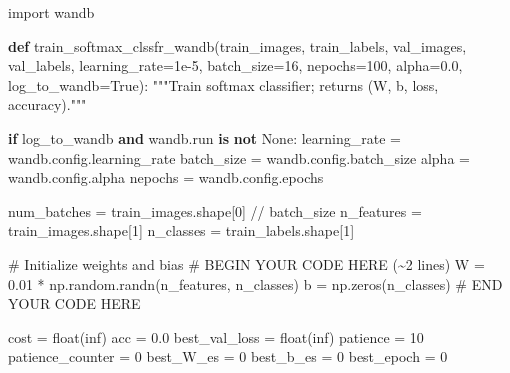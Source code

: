 \documentclass[
  letterpaper,
  DIV=11,
  numbers=noendperiod]{scrartcl}
\newenvironment{Shaded}{\begin{snugshade}}{\end{snugshade}}
\newcommand{\BuiltInTok}[1]{\textcolor[rgb]{0.00,0.23,0.31}{#1}}
\newcommand{\CommentTok}[1]{\textcolor[rgb]{0.37,0.37,0.37}{#1}}
\newcommand{\ControlFlowTok}[1]{\textcolor[rgb]{0.00,0.23,0.31}{\textbf{#1}}}
\newcommand{\DecValTok}[1]{\textcolor[rgb]{0.68,0.00,0.00}{#1}}
\newcommand{\FloatTok}[1]{\textcolor[rgb]{0.68,0.00,0.00}{#1}}
\newcommand{\ImportTok}[1]{\textcolor[rgb]{0.00,0.46,0.62}{#1}}
\newcommand{\KeywordTok}[1]{\textcolor[rgb]{0.00,0.23,0.31}{\textbf{#1}}}
\newcommand{\NormalTok}[1]{\textcolor[rgb]{0.00,0.23,0.31}{#1}}
\newcommand{\OperatorTok}[1]{\textcolor[rgb]{0.37,0.37,0.37}{#1}}
\newcommand{\RegionMarkerTok}[1]{\textcolor[rgb]{0.00,0.23,0.31}{#1}}
\newcommand{\StringTok}[1]{\textcolor[rgb]{0.13,0.47,0.30}{#1}}
\newcommand{\VariableTok}[1]{\textcolor[rgb]{0.07,0.07,0.07}{#1}}
\begin{document}
\begin{Shaded}
\begin{Highlighting}[]
\ImportTok{import}\NormalTok{ wandb}

\KeywordTok{def}\NormalTok{ train\_softmax\_clssfr\_wandb(train\_images, train\_labels, val\_images, val\_labels,}
\NormalTok{                              learning\_rate}\OperatorTok{=}\FloatTok{1e{-}5}\NormalTok{, batch\_size}\OperatorTok{=}\DecValTok{16}\NormalTok{, nepochs}\OperatorTok{=}\DecValTok{100}\NormalTok{, alpha}\OperatorTok{=}\FloatTok{0.0}\NormalTok{, log\_to\_wandb}\OperatorTok{=}\VariableTok{True}\NormalTok{):}
    \CommentTok{"""Train softmax classifier; returns (W, b, loss, accuracy)."""}

    \ControlFlowTok{if}\NormalTok{ log\_to\_wandb }\KeywordTok{and}\NormalTok{ wandb.run }\KeywordTok{is} \KeywordTok{not} \VariableTok{None}\NormalTok{:}
\NormalTok{        learning\_rate }\OperatorTok{=}\NormalTok{ wandb.config.learning\_rate}
\NormalTok{        batch\_size }\OperatorTok{=}\NormalTok{ wandb.config.batch\_size}
\NormalTok{        alpha }\OperatorTok{=}\NormalTok{ wandb.config.alpha}
\NormalTok{        nepochs }\OperatorTok{=}\NormalTok{ wandb.config.epochs}

\NormalTok{    num\_batches }\OperatorTok{=}\NormalTok{ train\_images.shape[}\DecValTok{0}\NormalTok{] }\OperatorTok{//}\NormalTok{ batch\_size}
\NormalTok{    n\_features }\OperatorTok{=}\NormalTok{ train\_images.shape[}\DecValTok{1}\NormalTok{]}
\NormalTok{    n\_classes }\OperatorTok{=}\NormalTok{ train\_labels.shape[}\DecValTok{1}\NormalTok{]}

    \CommentTok{\# Initialize weights and bias}
    \CommentTok{\# }\RegionMarkerTok{BEGIN}\CommentTok{ YOUR CODE HERE (\textasciitilde{}2 lines)}
\NormalTok{    W }\OperatorTok{=} \FloatTok{0.01} \OperatorTok{*}\NormalTok{ np.random.randn(n\_features, n\_classes)}
\NormalTok{    b }\OperatorTok{=}\NormalTok{ np.zeros(n\_classes)}
    \CommentTok{\# }\RegionMarkerTok{END}\CommentTok{ YOUR CODE HERE}

\NormalTok{    cost }\OperatorTok{=} \BuiltInTok{float}\NormalTok{(}\StringTok{\textquotesingle{}inf\textquotesingle{}}\NormalTok{)}
\NormalTok{    acc }\OperatorTok{=} \FloatTok{0.0}
\NormalTok{    best\_val\_loss }\OperatorTok{=} \BuiltInTok{float}\NormalTok{(}\StringTok{\textquotesingle{}inf\textquotesingle{}}\NormalTok{)}
\NormalTok{    patience }\OperatorTok{=} \DecValTok{10}
\NormalTok{    patience\_counter }\OperatorTok{=} \DecValTok{0}
\NormalTok{    best\_W\_es }\OperatorTok{=} \DecValTok{0}
\NormalTok{    best\_b\_es }\OperatorTok{=} \DecValTok{0}
\NormalTok{    best\_epoch }\OperatorTok{=} \DecValTok{0}


\end{Highlighting}
\end{Shaded}
\end{document}
